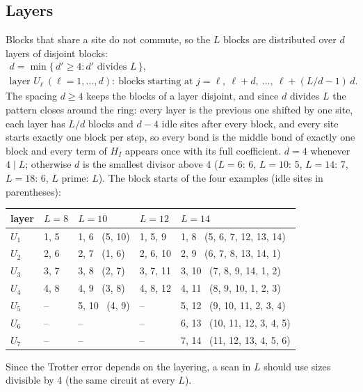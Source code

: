 \subsection{Layers}
\label{sec:floquet-layers}

Blocks that share a site do not commute, so the $L$ blocks are distributed over $d$ layers of disjoint blocks:
\begin{equation}
\begin{gathered}
d = \min\{\, d' \ge 4 : d' \text{ divides } L \,\}, \\
\text{layer } U_\ell \ (\ell = 1, \dots, d):\ \text{blocks starting at } j = \ell,\ \ell + d,\ \dots,\ \ell + (L/d - 1)\,d .
\end{gathered}
\label{eq:floquet-layers}
\end{equation}
The spacing $d \ge 4$ keeps the blocks of a layer disjoint, and since $d$ divides $L$ the pattern closes around the ring: every layer is the previous one shifted by one site, each layer has $L/d$ blocks and $d - 4$ idle sites after every block, and every site starts exactly one block per step, so every bond is the middle bond of exactly one block and every term of $H_I$ appears once with its full coefficient. $d = 4$ whenever $4 \mid L$; otherwise $d$ is the smallest divisor above 4 ($L = 6$: 6, $L = 10$: 5, $L = 14$: 7, $L = 18$: 6, $L$ prime: $L$). The block starts of the four examples (idle sites in parentheses):
\begin{center}
\small\setlength{\tabcolsep}{5pt}
\begin{tabular}{lllll}
\toprule
layer & $L = 8$ & $L = 10$ & $L = 12$ & $L = 14$ \\
\midrule
$U_1$ & 1, 5 & 1, 6 \ (5, 10) & 1, 5, 9 & 1, 8 \ (5, 6, 7, 12, 13, 14) \\
$U_2$ & 2, 6 & 2, 7 \ (1, 6) & 2, 6, 10 & 2, 9 \ (6, 7, 8, 13, 14, 1) \\
$U_3$ & 3, 7 & 3, 8 \ (2, 7) & 3, 7, 11 & 3, 10 \ (7, 8, 9, 14, 1, 2) \\
$U_4$ & 4, 8 & 4, 9 \ (3, 8) & 4, 8, 12 & 4, 11 \ (8, 9, 10, 1, 2, 3) \\
$U_5$ & -- & 5, 10 \ (4, 9) & -- & 5, 12 \ (9, 10, 11, 2, 3, 4) \\
$U_6$ & -- & -- & -- & 6, 13 \ (10, 11, 12, 3, 4, 5) \\
$U_7$ & -- & -- & -- & 7, 14 \ (11, 12, 13, 4, 5, 6) \\
\bottomrule
\end{tabular}
\end{center}
Since the Trotter error depends on the layering, a scan in $L$ should use sizes divisible by 4 (the same circuit at every $L$).

